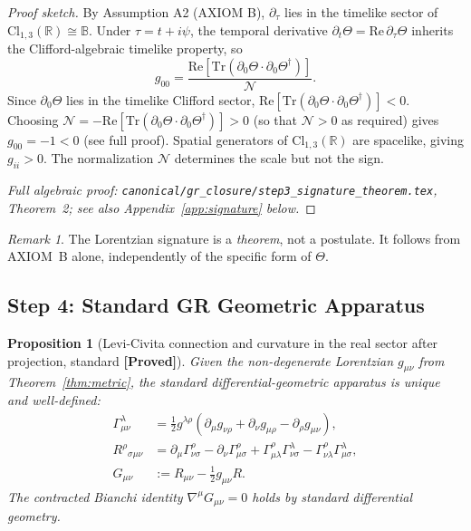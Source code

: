 \documentclass[12pt,a4paper]{article}
\newtheorem{proposition}[theorem]{Proposition}
\theoremstyle{definition}
\theoremstyle{remark}
\newtheorem{remark}[theorem]{Remark}
\newcommand{\PROVED}{\textbf{[Proved]}}
\begin{document}
\begin{proof}[Proof sketch]
By Assumption A2 (AXIOM B), $\partial_\tau$ lies in the timelike sector of
$\mathrm{Cl}_{1,3}(\mathbb{R})\cong\mathbb{B}$.  Under $\tau = t+i\psi$, the
temporal derivative $\partial_t\Theta = \mathrm{Re}\,\partial_\tau\Theta$
inherits the Clifford-algebraic timelike property, so
\[
  g_{00} = \frac{\mathrm{Re}[\mathrm{Tr}(\partial_0\Theta\cdot\partial_0\Theta^\dagger)]}{\mathcal{N}}.
\]
Since $\partial_0\Theta$ lies in the timelike Clifford sector,
$\mathrm{Re}[\mathrm{Tr}(\partial_0\Theta\cdot\partial_0\Theta^\dagger)] < 0$.
Choosing $\mathcal{N} = -\mathrm{Re}[\mathrm{Tr}(\partial_0\Theta\cdot\partial_0\Theta^\dagger)] > 0$
(so that $\mathcal{N}>0$ as required) gives $g_{00} = -1 < 0$
(see full proof).
Spatial generators of $\mathrm{Cl}_{1,3}(\mathbb{R})$ are spacelike, giving
$g_{ii}>0$.
The normalization $\mathcal{N}$ determines the scale but not the sign.

\smallskip
\noindent\textit{Full algebraic proof: \texttt{canonical/gr\_closure/step3\_signature\_theorem.tex},
Theorem~2; see also Appendix~\ref{app:signature} below.}
\end{proof}

\begin{remark}
The Lorentzian signature is a \emph{theorem}, not a postulate.
It follows from AXIOM~B alone, independently of the specific form of $\Theta$.
\end{remark}

\subsection{Step 4: Standard GR Geometric Apparatus}
\label{sec:step4}

\begin{proposition}[Levi-Civita connection and curvature in the real sector after projection, standard \PROVED]
Given the non-degenerate Lorentzian $g_{\mu\nu}$ from Theorem~\ref{thm:metric},
the standard differential-geometric apparatus is unique and well-defined:
\begin{align}
  \Gamma^\lambda_{\mu\nu} &= \tfrac{1}{2}g^{\lambda\rho}
    (\partial_\mu g_{\nu\rho}+\partial_\nu g_{\mu\rho}-\partial_\rho g_{\mu\nu}),\\
  R^\rho{}_{\sigma\mu\nu} &= \partial_\mu\Gamma^\rho_{\nu\sigma}
    -\partial_\nu\Gamma^\rho_{\mu\sigma}
    +\Gamma^\rho_{\mu\lambda}\Gamma^\lambda_{\nu\sigma}
    -\Gamma^\rho_{\nu\lambda}\Gamma^\lambda_{\mu\sigma},\\
  G_{\mu\nu} &:= R_{\mu\nu} - \tfrac{1}{2}g_{\mu\nu}R.
\end{align}
The contracted Bianchi identity $\nabla^\mu G_{\mu\nu}=0$ holds by
standard differential geometry.
\end{proposition}
\end{document}
